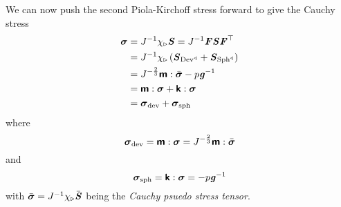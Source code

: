 We can now push the second Piola-Kirchoff stress forward to give the Cauchy
stress \ie
\begin{equation}
  \begin{split}
    \boldsymbol{\mathit{\sigma}}&={J}^{-1} \chi_{\triangleright}\boldsymbol{\mathit{S}} ={J}^{-1}\boldsymbol{\mathit{F}}\boldsymbol{\mathit{S}} {\boldsymbol{\mathit{F}}}^{ \top } 
    \\
    &={J}^{-1} \chi_{\triangleright}\left( \boldsymbol{\mathit{S}}_{ \operatorname{Dev}^{\triangleleft} }+\boldsymbol{\mathit{S}}_{ \operatorname{Sph}^{\triangleleft} } \right) \\
    &=J^{-\frac{2}{3}} \boldsymbol{\mathsf{m}} : \bar{\boldsymbol{\mathit{\sigma}}} -p{\boldsymbol{\mathit{g}}}^{-1}\\
    &= \boldsymbol{\mathsf{m}} : \boldsymbol{\mathit{\sigma}} + \boldsymbol{\mathsf{k}} : \boldsymbol{\mathit{\sigma}} \\
    &=\boldsymbol{\mathit{\sigma}}_{\operatorname{dev}}+\boldsymbol{\mathit{\sigma}}_{\operatorname{sph}}
  \end{split}
\end{equation}
where
\begin{equation}
  \tensor{\sigma}_{\devop}=\doubledotprod{\tensorfour{m}}{\tensortwo{\sigma}}=J^{-\frac{2}{3}}\doubledotprod{\tensorfour{m}}{\bar{\tensortwo{\sigma}}}
  \label{eqn:DeviatoricCauchyStress}
\end{equation}
and
\begin{equation}
  \tensor{\sigma}_{\sphop}=\doubledotprod{\tensorfour{k}}{\tensortwo{\sigma}}=-p\inverse{\tensor{g}}
  \label{eqn:SphericalCauchyStress}
\end{equation}
with $\bar{\boldsymbol{\mathit{\sigma}}}={J}^{-1} \chi_{\triangleright}\bar{\boldsymbol{\mathit{S}}} $
being the \emph{Cauchy psuedo stress
  tensor}.

